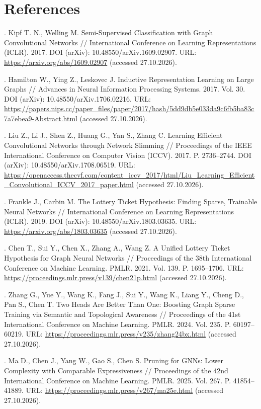 \documentclass[10pt,a4paper]{article}
\begin{document}
\renewcommand{\refname}{Список литературы}
\section*{References}
. Kipf T. N., Welling M. Semi-Supervised Classification with Graph Convolutional Networks // International Conference on Learning Representations (ICLR). 2017. DOI (arXiv): 10.48550/arXiv.1609.02907. URL: \url{https://arxiv.org/abs/1609.02907} (accessed 27.10.2026).\par
{}. Hamilton W., Ying Z., Leskovec J. Inductive Representation Learning on Large Graphs // Advances in Neural Information Processing Systems. 2017. Vol. 30. DOI (arXiv): 10.48550/arXiv.1706.02216. URL: \url{https://papers.nips.cc/paper_files/paper/2017/hash/5dd9db5e033da9c6fb5ba83c7a7ebea9-Abstract.html} (accessed 27.10.2026).\par
{}. Liu Z., Li J., Shen Z., Huang G., Yan S., Zhang C. Learning Efficient Convolutional Networks through Network Slimming // Proceedings of the IEEE International Conference on Computer Vision (ICCV). 2017. P. 2736–2744. DOI (arXiv): 10.48550/arXiv.1708.06519. URL: \url{https://openaccess.thecvf.com/content_iccv_2017/html/Liu_Learning_Efficient_Convolutional_ICCV_2017_paper.html} (accessed 27.10.2026).\par
{}. Frankle J., Carbin M. The Lottery Ticket Hypothesis: Finding Sparse, Trainable Neural Networks // International Conference on Learning Representations (ICLR). 2019. DOI (arXiv): 10.48550/arXiv.1803.03635. URL: \url{https://arxiv.org/abs/1803.03635} (accessed 27.10.2026).\par
{}. Chen T., Sui Y., Chen X., Zhang A., Wang Z. A Unified Lottery Ticket Hypothesis for Graph Neural Networks // Proceedings of the 38th International Conference on Machine Learning. PMLR. 2021. Vol. 139. P. 1695–1706. URL: \url{https://proceedings.mlr.press/v139/chen21p.html} (accessed 27.10.2026).\par
{}. Zhang G., Yue Y., Wang K., Fang J., Sui Y., Wang K., Liang Y., Cheng D., Pan S., Chen T. Two Heads Are Better Than One: Boosting Graph Sparse Training via Semantic and Topological Awareness // Proceedings of the 41st International Conference on Machine Learning. PMLR. 2024. Vol. 235. P. 60197–60219. URL: \url{https://proceedings.mlr.press/v235/zhang24bx.html} (accessed 27.10.2026).\par
{}. Ma D., Chen J., Yang W., Gao S., Chen S. Pruning for GNNs: Lower Complexity with Comparable Expressiveness // Proceedings of the 42nd International Conference on Machine Learning. PMLR. 2025. Vol. 267. P. 41854–41889. URL: \url{https://proceedings.mlr.press/v267/ma25e.html} (accessed 27.10.2026).\par
\end{document}
